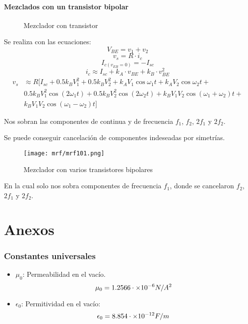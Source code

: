 \documentclass[
	12pt, %
	fleqn, %
	a4paper, %
	oneside, %
]{LegrandOrangeBook}
\begin{document}
\subsection{Mezclados con un transistor bipolar}
\begin{figure}[H]
\centering
{}
\caption{Mezclador con transistor}
\end{figure}
Se realiza con las ecuaciones:
\begin{equation}
V_{BE}=v_1+v_2
\end{equation}
\begin{equation}
v_s=R\cdot i_c
\end{equation}
\begin{equation}
I_{c(v_{EB}=0)}=-I_{sc}
\end{equation}
\begin{equation}
i_c\approx I_{sc}+k_A\cdot v_{BE}+k_B\cdot v_{BE}^2
\end{equation}
\begin{align}
v_s&\approx R[I_{sc}+0.5k_BV_1^2+0.5k_BV_2^2+k_AV_1\cos\omega_1t+k_AV_2\cos\omega_2t+\\
&0.5k_BV_1^2\cos(2\omega_1t)+0.5k_BV_2^2\cos(2\omega_2t)+k_BV_1V_2\cos(\omega_1+\omega_2)t+\\
&k_BV_1V_2\cos(\omega_1-\omega_2)t]
\end{align}
\begin{notation}
Nos sobran las componentes de continua y de frecuencia $f_1$, $f_2$, $2f_1$ y $2f_2$.
\end{notation}
Se puede conseguir cancelación de componentes indeseadas por simetrías.
\begin{figure}[H]
\centering
\texttt{[image: mrf/mrf101.png]}
\caption{Mezclador con varios transistores bipolares}
\end{figure}
En la cual solo nos sobra componentes de frecuencia $f_1$, donde se cancelaron $f_2$, $2f_1$ y $2f_2$.
\part{Anexos}
\section{Constantes universales}
\begin{itemize}
\item $\mu_0$: Permeabilidad en el vacío.
\begin{displaymath}
\mu_0=1.2566\cdot\times 10^{-6} N/A^2
\end{displaymath}
\item $\epsilon_0$: Permitividad en el vacío:
\begin{displaymath}
\epsilon_0=8.854\cdot\times 10^{-12} F/m
\end{displaymath}
\end{itemize}
\end{document}
